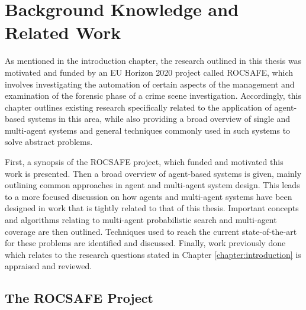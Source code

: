 

\chapter{Background Knowledge and Related Work}\label{chapter:Background}

\workinprogress
As mentioned in the introduction chapter, the research outlined in this thesis was motivated and funded by an EU Horizon 2020 project called ROCSAFE, which involves investigating the automation of certain aspects of the management and examination of the forensic phase of a crime scene investigation. Accordingly, this chapter outlines existing research specifically related to the application of agent-based systems in this area, while also providing a broad overview of single and multi-agent systems and general techniques commonly used in such systems to solve abstract problems. \par
First, a synopsis of the ROCSAFE project, which funded and motivated this work is presented. Then a broad overview of agent-based systems is given, mainly outlining common approaches in agent and multi-agent system design. This leads to a more focused discussion on how agents and multi-agent systems have been designed in work that is tightly related to that of this thesis. Important concepts and algorithms relating to multi-agent probabilistic search and multi-agent coverage are then outlined. Techniques used to reach the current state-of-the-art for these problems are identified and discussed. Finally, work previously done 
which relates to the research questions stated in Chapter \ref{chapter:introduction} is appraised and reviewed.

\section{The ROCSAFE Project}\label{sec:ROCSAFEBG}


